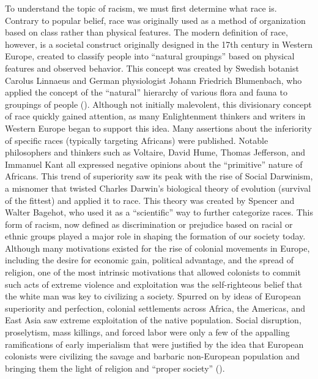 \documentclass[12pt, a4paper, twoside]{article}
\begin{document}
To understand the topic of racism, we must first determine what race is. Contrary to popular belief, race was originally used as a method of organization based on class rather than physical features. The modern definition of race, however, is a societal construct originally designed in the 17th century in Western Europe, created to classify people into “natural groupings” based on physical features and observed behavior. This concept was created by Swedish botanist Carolus Linnaeus and German physiologist Johann Friedrich Blumenbach, who applied the concept of the “natural” hierarchy of various flora and fauna to groupings of people (\cite{smedley2024}). Although not initially malevolent, this divisionary concept of race quickly gained attention, as many Enlightenment thinkers and writers in Western Europe began to support this idea. Many assertions about the inferiority of specific races (typically targeting Africans) were published. Notable philosophers and thinkers such as Voltaire, David Hume, Thomas Jefferson, and Immanuel Kant all expressed negative opinions about the “primitive” nature of Africans. This trend of superiority saw its peak with the rise of Social Darwinism, a misnomer that twisted Charles Darwin’s biological theory of evolution (survival of the fittest) and applied it to race. This theory was created by Spencer and Walter Bagehot, who used it as a “scientific” way to further categorize races. This form of racism, now defined as discrimination or prejudice based on racial or ethnic groups played a major role in shaping the formation of our society today. Although many motivations existed for the rise of colonial movements in Europe, including the desire for economic gain, political advantage, and the spread of religion, one of the most intrinsic motivations that allowed colonists to commit such acts of extreme violence and exploitation was the self-righteous belief that the white man was key to civilizing a society. Spurred on by ideas of European superiority and perfection, colonial settlements across Africa, the Americas, and East Asia saw extreme exploitation of the native population. Social disruption, proselytism, mass killings, and forced labor were only a few of the appalling ramifications of early imperialism that were justified by the idea that European colonists were civilizing the savage and barbaric non-European population and bringing them the light of religion and “proper society” (\cite{kipling1899}).
\end{document}
